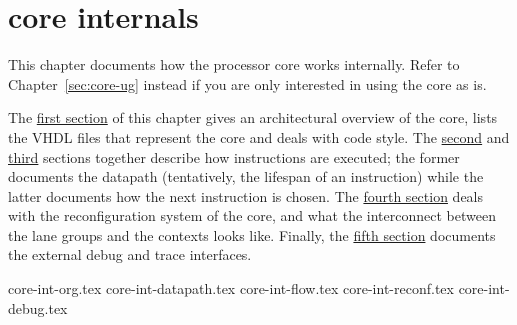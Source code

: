 \chapter{\rvex{} core internals}
\label{sec:core-int}

This chapter documents how the \rvex{} processor core works internally. Refer to
Chapter~\ref{sec:core-ug} instead if you are only interested in using the core
as is.

The \hyperref[sec:core-int-org]{first section} of this chapter gives an 
architectural overview of the core, lists the VHDL files that represent the 
core and deals with code style. The \hyperref[sec:core-int-datapath]{second} and 
\hyperref[sec:core-int-flow]{third} sections together describe how instructions 
are executed; the former documents the datapath (tentatively, the lifespan of an 
instruction) while the latter documents how the next instruction is chosen. The 
\hyperref[sec:core-int-reconf]{fourth section} deals with the reconfiguration 
system of the core, and what the interconnect between the lane groups and the 
contexts looks like. Finally, the \hyperref[sec:core-int-debug]{fifth section} 
documents the external debug and trace interfaces.

{core-int-org.tex}
{core-int-datapath.tex}
{core-int-flow.tex}
{core-int-reconf.tex}
{core-int-debug.tex}
